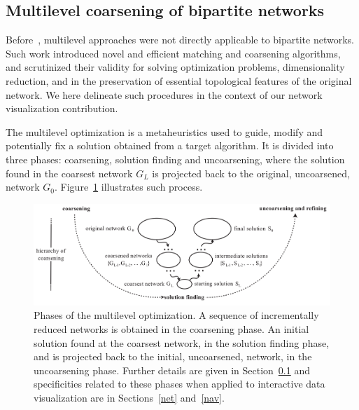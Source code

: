 \documentclass[runningheads]{llncs}
\begin{document}
\subsection{Multilevel coarsening of bipartite networks}\label{bac}
Before~\cite{alan2}, multilevel approaches were not directly applicable to bipartite networks.
Such work introduced novel and efficient matching and coarsening algorithms,
and scrutinized their validity for solving optimization problems, dimensionality reduction,
and in the preservation of essential topological features of the original network.
We here delineate such procedures in the context of our network visualization contribution.

The multilevel optimization is a metaheuristics used to guide,
modify and potentially fix a solution obtained from a target algorithm.
It is divided into three phases: coarsening, solution finding and uncoarsening,
where the solution found in the coarsest network $G_L$ is projected back to the original,
uncoarsened, network $G_0$.
Figure~\ref{mlf} illustrates such process.

\begin{figure}[!h]\centering
 \includegraphics[width=\textwidth]{mlf}
  \caption{Phases of the multilevel optimization.
  A sequence of incrementally reduced networks is obtained in the coarsening phase.
  An initial solution found at the coarsest network, in the solution finding phase,
  and is projected back to the initial, uncoarsened, network, in the uncoarsening phase.
  Further details are given in Section~\ref{bac} and specificities related to these
  phases when applied to interactive data visualization are in Sections~\ref{net} and~\ref{nav}.
  }\label{mlf}
\end{figure}
\end{document}
